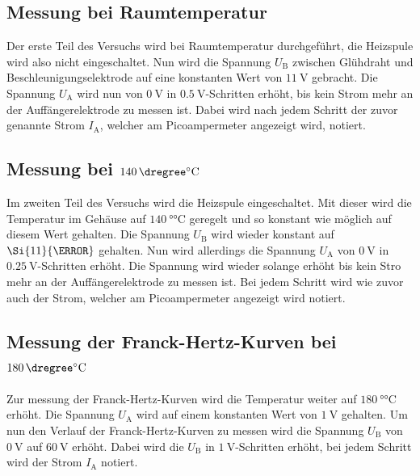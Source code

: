 \subsection{Messung bei Raumtemperatur}
Der erste Teil des Versuchs wird bei Raumtemperatur durchgeführt, die Heizspule wird also nicht eingeschaltet.
Nun wird die Spannung $U_\text{B}$ zwischen Glühdraht und Beschleunigungselektrode auf eine konstanten Wert von $\SI{11}{\V}$ gebracht.
Die Spannung $U_\text{A}$ wird nun von $\SI{0}{\V}$ in $\SI{0.5}{\V}$-Schritten erhöht, bis kein Strom mehr an der Auffängerelektrode zu messen ist.
Dabei wird nach jedem Schritt der zuvor genannte Strom $I_\text{A}$, welcher am Picoampermeter angezeigt wird, notiert.

\subsection{Messung bei $\SI{140}{\dregree\celsius}$}
Im zweiten Teil des Versuchs wird die Heizspule eingeschaltet.
Mit dieser wird die Temperatur im Gehäuse auf $\SI{140}{\degree\celsius}$ geregelt und so konstant wie möglich auf diesem Wert gehalten.
Die Spannung $U_\text{B}$ wird wieder konstant auf $\Si{11}{\V}$ gehalten.
Nun wird allerdings die Spannung $U_\text{A}$ von $\SI{0}{\V}$ in $\SI{0.25}{\V}$-Schritten erhöht.
Die Spannung wird wieder solange erhöht bis kein Stro mehr an der Auffängerelektrode zu messen ist.
Bei jedem Schritt wird wie zuvor auch der Strom, welcher am Picoampermeter angezeigt wird notiert.

\subsection{Messung der Franck-Hertz-Kurven bei $\SI{180}{\dregree\celsius}$}
Zur messung der Franck-Hertz-Kurven wird die Temperatur weiter auf $\SI{180}{\degree\celsius}$ erhöht.
Die Spannung $U_\text{A}$ wird auf einem konstanten Wert von $\SI{1}{\V}$ gehalten.
Um nun den Verlauf der Franck-Hertz-Kurven zu messen wird die Spannung $U_\text{B}$ von $\SI{0}{\V}$ auf $\SI{60}{\V}$ erhöht.
Dabei wird die $U_\text{B}$ in $\SI{1}{\V}$-Schritten erhöht, bei jedem Schritt wird der Strom $I_\text{A}$ notiert.
